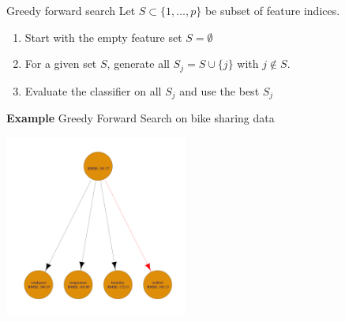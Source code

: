 \documentclass[11pt,compress,t,notes=noshow, xcolor=table]{beamer}
\begin{document}

\begin{frame}{Greedy forward search}
Let $S \subset \{1, \dots, p \}$ be subset of feature indices.
\vspace{-0.01cm}
    \begin{enumerate}
      \item Start with the empty feature set $S = \emptyset$
      \item For a given set $S$, generate all $S_j = S \cup \{j\}$ with $j \notin S$.
      \item Evaluate the classifier on all $S_j$ and use the best $S_j$
      \end{enumerate}
    \textbf{Example} Greedy Forward Search on bike sharing data
    \begin{center}
    \includegraphics[width = 0.45\textwidth]{figure/fs-wrappers-powerset-tree-1.png}
    \end{center}

\end{frame}
\end{document}
